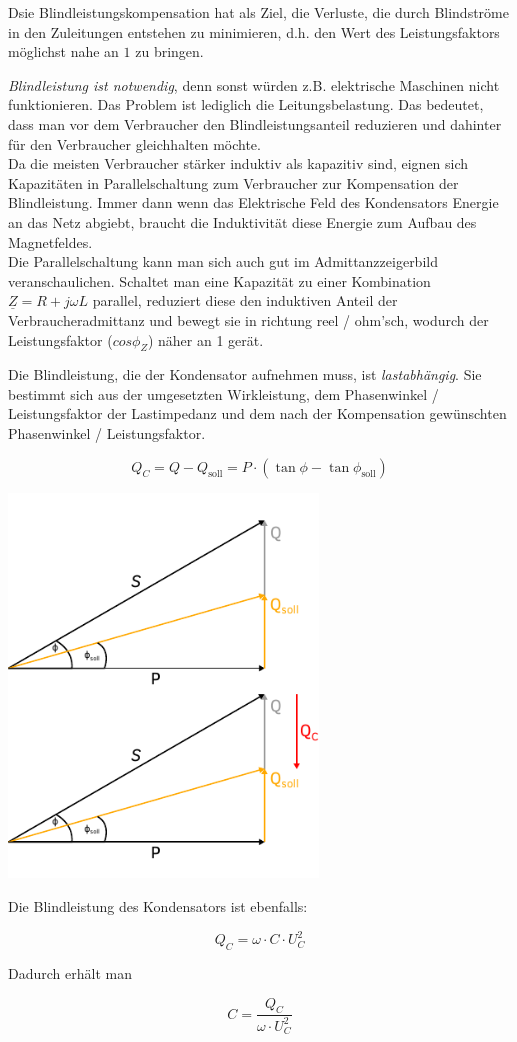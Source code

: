\documentclass{article}
\begin{document}
\begin{tcolorbox}
Dsie Blindleistungskompensation hat als Ziel, die Verluste, die durch Blindströme in den Zuleitungen entstehen zu minimieren, d.h. den Wert des Leistungsfaktors möglichst nahe an $1$ zu bringen. 
\end{tcolorbox}

\emph{Blindleistung ist notwendig}, denn sonst würden z.B. elektrische Maschinen nicht funktionieren. Das Problem ist lediglich die Leitungsbelastung. Das bedeutet, dass man vor dem Verbraucher den Blindleistungsanteil reduzieren und dahinter für den Verbraucher gleichhalten möchte.\\

Da die meisten Verbraucher stärker induktiv als kapazitiv sind, eignen sich Kapazitäten in Parallelschaltung zum Verbraucher zur Kompensation der Blindleistung. Immer dann wenn das Elektrische Feld des Kondensators Energie an das Netz abgiebt, braucht die Induktivität diese Energie zum Aufbau des Magnetfeldes.\\

Die Parallelschaltung kann man sich auch gut im Admittanzzeigerbild veranschaulichen. Schaltet man eine Kapazität zu einer Kombination $\underline{Z} = R + j \omega L$ parallel, reduziert diese den induktiven Anteil der Verbraucheradmittanz und bewegt sie in richtung reel / ohm'sch, wodurch der Leistungsfaktor ($cos{\phi_{Z}}$) näher an 1 gerät.

Die Blindleistung, die der Kondensator aufnehmen muss, ist \emph{lastabhängig}. Sie bestimmt sich aus der umgesetzten Wirkleistung, dem Phasenwinkel / Leistungsfaktor der Lastimpedanz und dem nach der Kompensation gewünschten Phasenwinkel / Leistungsfaktor.

\[Q_{C} = Q - Q_{\text{soll}} = P \cdot (\tan{\phi} - \tan{\phi_{\text{soll}}})\]

\begin{center}
\includegraphics[width=0.618\textwidth]{drawing}
\end{center}

Die Blindleistung des Kondensators ist ebenfalls:

\[ Q_{C} = \omega \cdot C \cdot U_{C}^{2}\]

Dadurch erhält man

\[C = \frac{Q_{C}}{\omega \cdot U_{C}^{2}}\]
\end{document}
